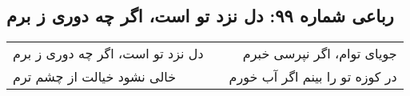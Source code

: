 \begin{center}
\section*{رباعی شماره ۹۹: دل نزد تو است، اگر چه دوری ز برم}
\label{sec:099}
\begin{longtable}{l p{0.5cm} r}
دل نزد تو است، اگر چه دوری ز برم
&&
جویای توام، اگر نپرسی خبرم
\\
خالی نشود خیالت از چشم ترم
&&
در کوزه تو را بینم اگر آب خورم
\\
\end{longtable}
\end{center}

